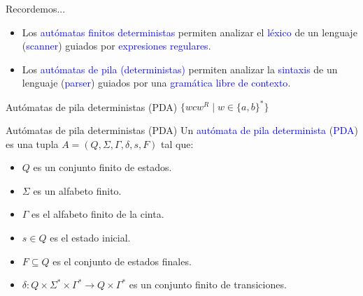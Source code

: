 \documentclass[handout]{beamer} %
\newcommand{\blue}[1]{\textcolor{blue}{#1}}
\begin{document}
\begin{frame}{Recordemos...}
    \begin{itemize}
        \item<1-> Los \blue{autómatas finitos deterministas} permiten analizar el \blue{léxico} de un lenguaje (\blue{scanner}) guiados por \blue{expresiones regulares}.
        \item<2-> Los \blue{autómatas de pila (deterministas)} permiten analizar la \blue{sintaxis} de un lenguaje (\blue{parser}) guiados por una \blue{gramática libre de contexto}.
    \end{itemize}
\end{frame}

\begin{frame}{Autómatas de pila deterministas (PDA)}
    $\{wcw^R\mid w\in \{a,b\}^*\}$
    \begin{center}
    \end{center}
\end{frame}

\begin{frame}{Autómatas de pila deterministas (PDA)}
  Un \blue{autómata de pila determinista} (\blue{PDA}) es una tupla $A=(Q,\Sigma,\Gamma,\delta,s,F)$ tal que:
 \begin{itemize}
  \item $Q$ es un conjunto finito de estados.
  \item $\Sigma$ es un alfabeto finito.
  \item $\Gamma$ es el alfabeto finito de la cinta.
  \item $s\in Q$ es el estado inicial.
  \item $F\subseteq Q$ es el conjunto de estados finales.
  \item $\delta: Q\times\Sigma^*\times\Gamma^* \to Q\times\Gamma^*$ es un conjunto finito de transiciones.
 \end{itemize}
\end{frame}
\end{document}
